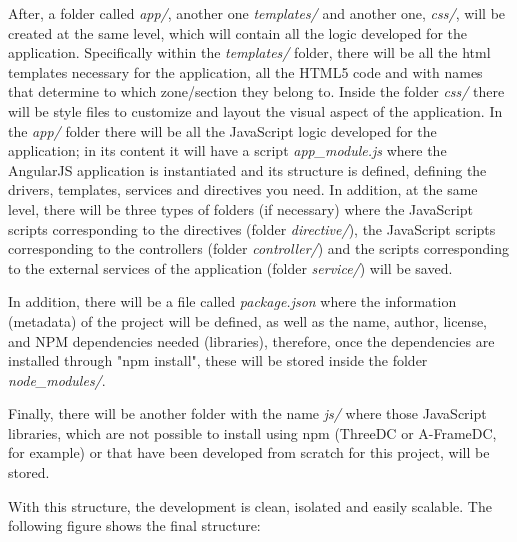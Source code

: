 \documentclass[a4paper, 12pt]{book}
\begin{document}
After, a folder called \textit{app/}, another one \textit{templates/} and another one, \textit{css/}, will be created at the same level, which will contain all the logic developed for the application. Specifically within the \textit{templates/} folder, there will be all the html templates necessary for the application, all the HTML5 code and with names that determine to which zone/section they belong to. Inside the folder \textit{css/} there will be style files to customize and layout the visual aspect of the application. In the \textit{app/} folder there will be all the JavaScript logic developed for the application; in its content it will have a script \textit{app\_module.js} where the AngularJS application is instantiated and its structure is defined, defining the drivers, templates, services and directives you need. In addition, at the same level, there will be three types of folders (if necessary) where the JavaScript scripts corresponding to the directives (folder \textit{directive/}), the JavaScript scripts corresponding to the controllers (folder \textit{controller/}) and the scripts corresponding to the external services of the application (folder \textit{service/}) will be saved.

In addition, there will be a file called \textit{package.json} where the information (metadata) of the project will be defined, as well as the name, author, license, and NPM dependencies needed (libraries), therefore, once the dependencies are installed through "npm install", these will be stored inside the folder \textit{node\_modules/}.

Finally, there will be another folder with the name \textit{js/} where those JavaScript libraries, which are not possible to install using npm (ThreeDC or A-FrameDC, for example) or that have been developed from scratch for this project, will be stored.

With this structure, the development is clean, isolated and easily scalable. The following figure shows the final structure:
\end{document}
